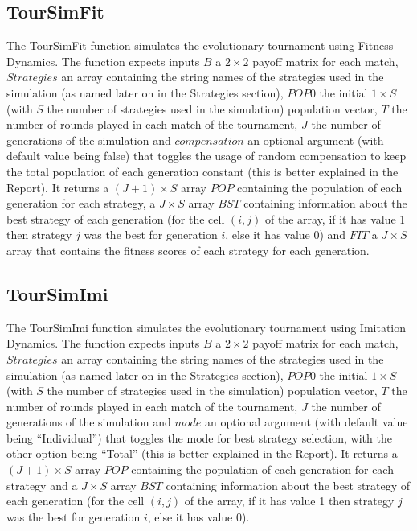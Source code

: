 \subsection{TourSimFit}
The TourSimFit function simulates the evolutionary tournament using Fitness Dynamics. The function expects inputs $B$ a $2 \times 2$ payoff matrix for each match, $Strategies$ an array containing the string names of the strategies used in the simulation (as named later on in the Strategies section), $POP0$ the initial $1 \times S$ (with $S$ the number of strategies used in the simulation) population vector, $T$ the number of rounds played in each match of the tournament, $J$ the number of generations of the simulation and $compensation$ an optional argument (with default value being false) that toggles the usage of random compensation to keep the total population of each generation constant (this is better explained in the Report). It returns a $(J+1) \times S$ array $POP$ containing the population of each generation for each strategy, a $J \times S$ array $BST$ containing information about the best strategy of each generation (for the cell $(i,j)$ of the array, if it has value 1 then strategy $j$ was the best for generation $i$, else it has value 0) and $FIT$ a $J \times S$ array that contains the fitness scores of each strategy for each generation.

\subsection{TourSimImi}
The TourSimImi function simulates the evolutionary tournament using Imitation Dynamics. The function expects inputs $B$ a $2 \times 2$ payoff matrix for each match, $Strategies$ an array containing the string names of the strategies used in the simulation (as named later on in the Strategies section), $POP0$ the initial $1 \times S$ (with $S$ the number of strategies used in the simulation) population vector, $T$ the number of rounds played in each match of the tournament, $J$ the number of generations of the simulation and $mode$ an optional argument (with default value being ``Individual'') that toggles the mode for best strategy selection, with the other option being ``Total'' (this is better explained in the Report). It returns a $(J+1) \times S$ array $POP$ containing the population of each generation for each strategy and a $J \times S$ array $BST$ containing information about the best strategy of each generation (for the cell $(i,j)$ of the array, if it has value 1 then strategy $j$ was the best for generation $i$, else it has value 0).

